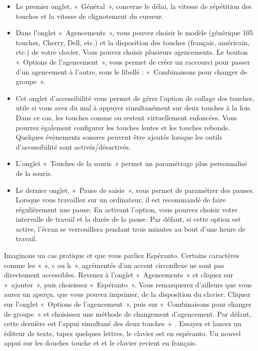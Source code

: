 \begin{itemize}
\item Le premier onglet, «~Général~», concerne le délai, la vitesse de répétition des touches et la vitesse de clignotement du curseur.
\item Dans l'onglet «~Agencements~», vous pouvez choisir le modèle (générique 105 touches, Cherry, Dell, etc.) et la disposition des touches (français, américain, etc.) de votre clavier. Vous pouvez choisir plusieurs agencements. Le bouton «~Options de l'agencement~», vous permet de créer un raccourci pour passer d'un agencement à l'autre, sous le libellé : «~Combinaisons pour changer de groupe~».
\item Cet onglet d'accessibilité vous permet de gérer l'option de collage des touches, utile si vous avez du mal à appuyer simultanément sur deux touches à la fois. Dans ce cas, les touches comme  ou  restent virtuellement enfoncées. Vous pourrez également configurer les touches lentes et les touches rebonds. Quelques évènements sonores peuvent être ajoutés lorsque les outils d'accessibilité sont activés/désactivés.
\item L'onglet «~Touches de la souris~» permet un paramétrage plus personnalisé de la souris. 
\item Le dernier onglet, «~Pause de saisie~», vous permet de paramétrer des pauses. Lorsque vous travaillez sur un ordinateur, il est recommandé de faire régulièrement une pause. En activant l'option, vous pourrez choisir votre intervalle de travail et la durée de la pause. Par défaut, si cette option est active, l'écran se verrouillera pendant trois minutes au bout d'une heure de travail.
\end{itemize}\par
Imaginons un cas pratique et que vous parliez Espéranto. Certains caractères comme les «~s, c ou h~», agrémentés d'un accent circonflexe ne sont pas directement accessibles. Revenez à l'onglet «~Agencements~» et cliquez sur «~ajouter~», puis choisissez «~Espéranto~». Vous remarquerez d'ailleurs que vous aurez un aperçu, que vous pouvez imprimer, de la disposition du clavier. Cliquez sur l'onglet «~Options de l'agencement~», puis sur «~Combinaisons pour changer de groupe~» et choisissez une méthode de changement d'agencement. Par défaut, cette dernière est l'appui simultané des deux touches  + . Essayez et lancez un éditeur de texte, tapez quelques lettres, le clavier est en espéranto. Un nouvel appui sur les douches touche  et  et le clavier revient en français.\\
